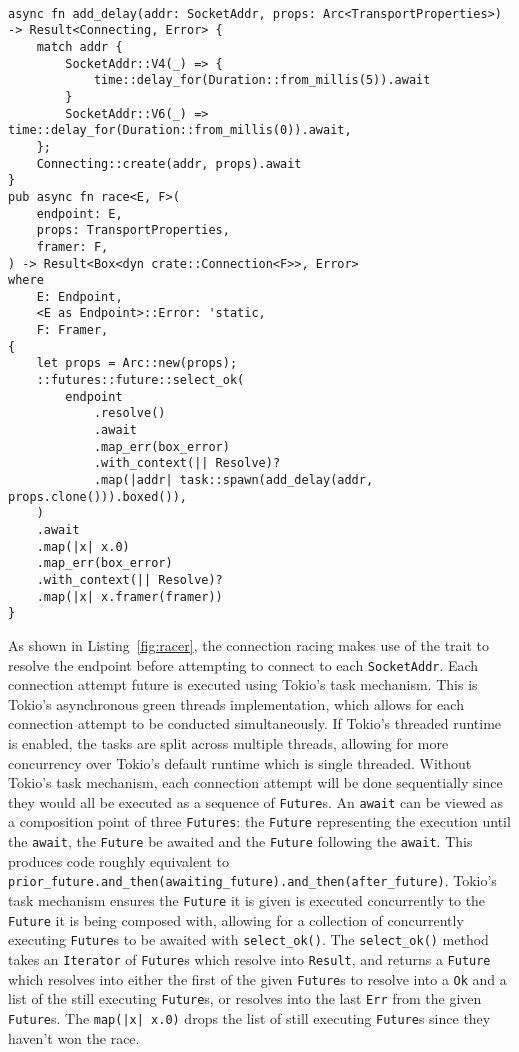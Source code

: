 \begin{lstlisting}[float=h!, label=fig:racer, caption={The connection racing implementation, with the delay on IPv4
        addresses.}]

async fn add_delay(addr: SocketAddr, props: Arc<TransportProperties>) -> Result<Connecting, Error> {
    match addr {
        SocketAddr::V4(_) => {
            time::delay_for(Duration::from_millis(5)).await
        }
        SocketAddr::V6(_) => time::delay_for(Duration::from_millis(0)).await,
    };
    Connecting::create(addr, props).await
}
pub async fn race<E, F>(
    endpoint: E,
    props: TransportProperties,
    framer: F,
) -> Result<Box<dyn crate::Connection<F>>, Error>
where
    E: Endpoint,
    <E as Endpoint>::Error: 'static,
    F: Framer,
{
    let props = Arc::new(props);
    ::futures::future::select_ok(
        endpoint
            .resolve()
            .await
            .map_err(box_error)
            .with_context(|| Resolve)?
            .map(|addr| task::spawn(add_delay(addr, props.clone())).boxed()),
    )
    .await
    .map(|x| x.0)
    .map_err(box_error)
    .with_context(|| Resolve)?
    .map(|x| x.framer(framer))
}
\end{lstlisting}

As shown in Listing~\ref{fig:racer}, the connection racing makes use of the \Endpoint{} trait to resolve the
endpoint before attempting to connect to each \texttt{SocketAddr}.
Each connection attempt future is executed using Tokio's task mechanism.
This is Tokio's asynchronous green threads implementation, which allows for each connection attempt to be conducted
simultaneously.
If Tokio's threaded runtime is enabled, the tasks are split across multiple threads, allowing for more concurrency over
Tokio's default runtime which is single threaded.
Without Tokio's task mechanism, each connection attempt will be done sequentially since they would all be executed as a
sequence of \texttt{Future}s.
An \texttt{await} can be viewed as a composition point of three \texttt{Futures}: the \texttt{Future} representing the
execution until the \texttt{await}, the \texttt{Future} be awaited and the \texttt{Future} following the \texttt{await}.
This produces code roughly equivalent to \lstinline{prior_future.and_then(awaiting_future).and_then(after_future)}.
Tokio's task mechanism ensures the \texttt{Future} it is given is executed concurrently to the \texttt{Future} it is
being composed with, allowing for a collection of concurrently executing \texttt{Future}s to be awaited with
\texttt{select\_ok()}.
The \texttt{select\_ok()} method takes an \texttt{Iterator} of \texttt{Future}s which resolve into \texttt{Result}, and
returns a \texttt{Future} which resolves into either the first of the given \texttt{Future}s to resolve into a
\texttt{Ok} and a list of the still executing \texttt{Future}s, or resolves into the last \texttt{Err} from the given
\texttt{Future}s.
The \texttt{map(|x| x.0)} drops the list of still executing \texttt{Future}s since they haven't won the race.

